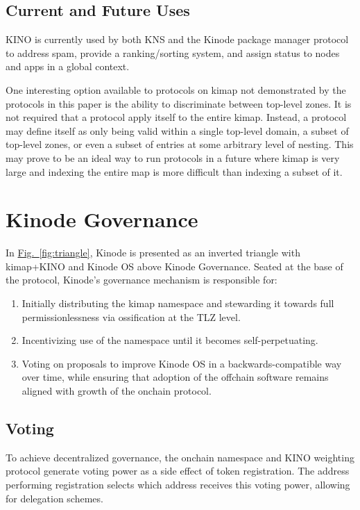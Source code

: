 \documentclass[runningheads]{llncs}
\begin{document}
\subsection{Current and Future Uses}
\label{sec:kinouses}

KINO is currently used by both KNS and the Kinode package manager protocol to address spam, provide a ranking/sorting system, and assign status to nodes and apps in a global context.

One interesting option available to protocols on kimap not demonstrated by the protocols in this paper is the ability to discriminate between top-level zones.
It is not required that a protocol apply itself to the entire kimap.
Instead, a protocol may define itself as only being valid within a single top-level domain, a subset of top-level zones, or even a subset of entries at some arbitrary level of nesting.
This may prove to be an ideal way to run protocols in a future where kimap is very large and indexing the entire map is more difficult than indexing a subset of it.

\section{Kinode Governance}
\label{sec:governance}

In \hyperref[fig:triangle]{Fig.~\ref{fig:triangle}}, Kinode is presented as an inverted triangle with kimap+KINO and Kinode OS above Kinode Governance.
Seated at the base of the protocol, Kinode's governance mechanism is responsible for:
\begin{enumerate}
    \item Initially distributing the kimap namespace and stewarding it towards full permissionlessness via ossification at the TLZ level.
    \item Incentivizing use of the namespace until it becomes self-perpetuating.
    \item Voting on proposals to improve Kinode OS in a backwards-compatible way over time, while ensuring that adoption of the offchain software remains aligned with growth of the onchain protocol.
\end{enumerate}

\subsection{Voting}
\label{sec:voting}

To achieve decentralized governance, the onchain namespace and KINO weighting protocol generate voting power as a side effect of token registration.
The address performing registration selects which address receives this voting power, allowing for delegation schemes.
\end{document}
